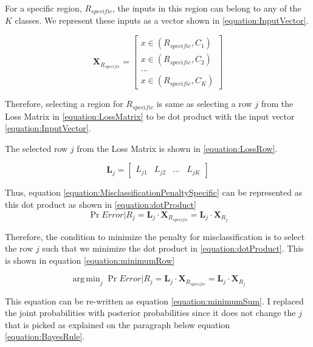 \documentclass[a4paper,12pt]{article}
\DeclareMathOperator*{\argmin}{arg\,min}
\begin{document}
For a specific region, $R_{specific}$, the inputs in this region can belong to any of the $K$ classes. We represent these inputs as a vector shown in \ref{equation:InputVector}. 

\begin{equation}
\label{equation:InputVector}
\mathbf{X}_{R_{specific}} =
  \begin{bmatrix}
    x \in (R_{specific}, C_{1}) \\
    x \in (R_{specific}, C_{2})  \\
    ... \\
    x \in (R_{specific}, C_{K})  
  \end{bmatrix}
\end{equation}

Therefore, selecting a region for $R_{specific}$ is same as selecting a row $j$ from the Loss Matrix in \ref{equation:LossMatrix} to be dot product with the input vector \ref{equation:InputVector}.

The selected row $j$ from the Loss Matrix is shown in \ref{equation:LossRow}. 

\begin{equation}
\label{equation:LossRow}
\mathbf{L}_{j} =
  \begin{bmatrix}
    L_{j1} & L_{j2} & ... & L_{jK}
  \end{bmatrix}
\end{equation}

Thus, equation \ref{equation:MisclassificationPenaltySpecific} can be represented as this dot product as shown in \ref{equation:dotProduct}
\begin{equation}
\label{equation:dotProduct}
\Pr{Error | R_{j}} = \mathbf{L}_{j} \cdot \mathbf{X}_{R_{specific}} = \mathbf{L}_{j} \cdot \mathbf{X}_{R_{j}}
\end{equation}

Therefore, the condition to minimize the penalty for misclassification is to select the row $j$ such that we minimize the dot product in \ref{equation:dotProduct}. 
This is shown in equation \ref{equation:minimumRow}

\begin{equation}
\label{equation:minimumRow}
 \argmin_j \Pr{Error | R_{j}} = \mathbf{L}_{j} \cdot \mathbf{X}_{R_{specific}} =  \mathbf{L}_{j} \cdot \mathbf{X}_{R_{j}}
\end{equation}

This equation can be re-written as equation \ref{equation:minimumSum}. I replaced the joint probabilities with posterior probabilities since it does not change the $j$ that is picked as explained on the paragraph below equation \ref{equation:BayesRule}. 
\end{document}
